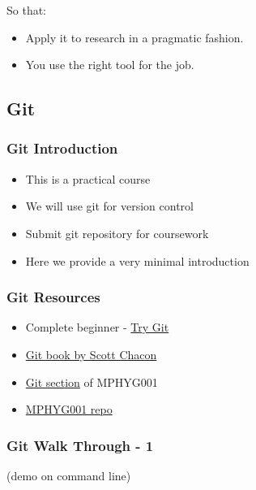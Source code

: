 So that:

\begin{itemize}
\itemsep1pt\parskip0pt
\item
  Apply it to research in a pragmatic fashion.
\item
  You use the right tool for the job.
\end{itemize}

\subsection{Git}\label{git}

\subsubsection{Git Introduction}\label{git-introduction}

\begin{itemize}
\itemsep1pt\parskip0pt
\item
  This is a practical course
\item
  We will use git for version control
\item
  Submit git repository for coursework
\item
  Here we provide a very minimal introduction
\end{itemize}

\subsubsection{Git Resources}\label{git-resources}

\begin{itemize}
\itemsep1pt\parskip0pt
\item
  Complete beginner - \href{https://try.github.io}{Try Git}
\item
  \href{https://git-scm.com/book/en/v2}{Git book by Scott Chacon}
\item
  \href{http://github-pages.ucl.ac.uk/rsd-engineeringcourse/ch02git/}{Git
  section} of MPHYG001
\item
  \href{https://github.com/UCL/rsd-engineeringcourse}{MPHYG001 repo}
\end{itemize}

\subsubsection{Git Walk Through - 1}\label{git-walk-through---1}

(demo on command line)

